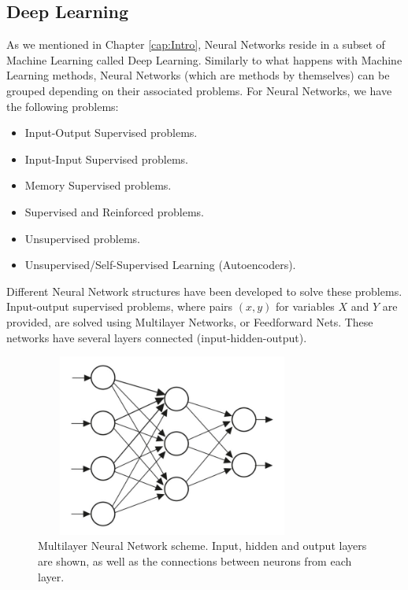 \subsection{Deep Learning}
As we mentioned in Chapter \ref{cap:Intro}, Neural Networks reside in a subset of Machine Learning called Deep Learning. Similarly to what happens with Machine Learning methods, Neural Networks (which are methods by themselves) can be grouped depending on their associated problems. For Neural Networks, we have the following problems:

\begin{itemize}
    \item Input-Output Supervised problems.
    \item Input-Input Supervised problems.
    \item Memory Supervised problems.
    \item Supervised and Reinforced problems.
    \item Unsupervised problems.
    \item Unsupervised/Self-Supervised Learning (Autoencoders).
\end{itemize}
Different Neural Network structures have been developed to solve these problems. Input-output supervised problems, where pairs $(x,y)$ for variables $X$ and $Y$ are provided, are solved using Multilayer Networks, or Feedforward Nets. These networks have several layers connected (input-hidden-output).

\begin{figure}[h!]
  \begin{center}
    \includegraphics[width=90mm, height=60mm]{Figuras/MultilayerNN.png}\par
    \caption{Multilayer Neural Network scheme. Input, hidden and output layers are shown, as well as the connections between neurons from each layer.}
    \label{fig:MultilayerNN}
  \end{center}
\end{figure}

